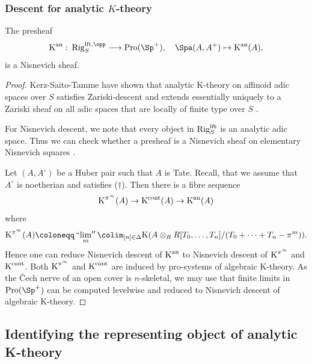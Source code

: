 \documentclass[colorinlistoftodos,article,11pt,reqno]{article}
\newcommand{\Rig}{\textup{Rig}}
\newcommand{\Pro}{\textup{Pro}}
\newcommand{\lft}{\textup{lft}}
\newcommand{\K}{\textup{K}}
\newcommand{\Kan}{\K^\textup{an}}
\newcommand{\Kcont}{\K^\textup{cont}}
\newcommand{\To}[1][]{\overset{#1}{\longrightarrow}}
\DeclareMathOperator*{\prolim}{``lim''}
\begin{document}
\subsubsection*{Descent for analytic $K$-theory}

\begin{lem}
The presheaf
\[ \Kan \,\colon\, \Rig_S^{\lft,\opp} \To \Pro(\Sp^+),\quad \Spa(A,A^+)\mapsto\Kan(A), \]
is a Nisnevich sheaf.
\end{lem}
\begin{proof}
Kerz-Saito-Tamme have shown that analytic K-theory on affinoid adic spaces over $S$ satisfies Zariski-descent and extends essentially uniquely to a Zariski sheaf on all adic spaces that are locally of finite type over $S$ \cite[Thm. 4.1]{kst-ii}.

For Nisnevich descent, we note that every object in $\Rig_S^\lft$ is an analytic adic space. Thus we can check whether a presheaf is a Nisnevich sheaf on elementary Nisnevich squares \cite[Kor.~A.28]{andreychev-thesis}. 

Let $(A,A^{\circ})$ be a Huber pair such that $A$ is Tate. Recall, that we assume that $A^{\circ}$ is noetherian and satisfies ($\dagger$). Then there is a fibre sequence \cite[Thm. 2.10]{kst-ii}
$$
	\K^{\pi^{\infty}}(A)\rightarrow \Kcont(A)\rightarrow \Kan(A)
$$
where 
$$
	\K^{\pi^{\infty}}(A)\coloneqq \prolim_{m}\colim_{[n]\in \Delta}\K(A\otimes_{R} R[T_{0},\dots,T_{n}]/(T_{0}+\dots+T_{n} - \pi^{m})).
$$
Hence one can reduce Nisnevich descent of $\Kan$ to Nisnevich descent of $\K^{\pi^{\infty}}$ and $\Kcont$. Both $\K^{\pi^{\infty}}$ and $\Kcont$ are induced by pro-systems of algebraic K-theory. As the \v{C}ech nerve of an open cover is $n$-skeletal, we may use that finite limits in $\Pro(\Sp^+)$ can be computed levelwise and reduced to Nisnevich descent of algebraic K-theory.
\end{proof}


\subsection{Identifying the representing object of analytic K-theory}
\label{subsec:representability}
\end{document}
